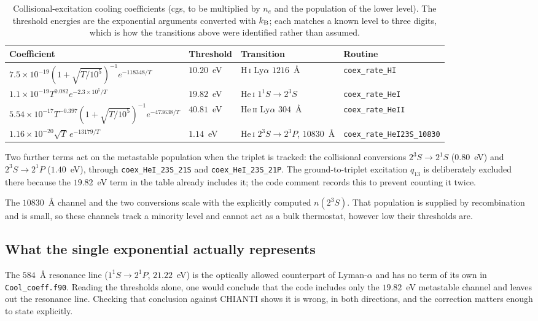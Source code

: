 \documentclass[english,a4paper]{my_memo}
\begin{document}
\begin{table}[h]
\centering
\small
\begin{tabular}{@{}llll@{}}
\toprule
Coefficient & Threshold & Transition & Routine \\
\midrule
$7.5\!\times\!10^{-19}(1+\sqrt{T/10^5})^{-1}e^{-118348/T}$
  & $10.20$~eV & H\,\textsc{i} Ly$\alpha$ $1216$~\AA{}
  & \texttt{coex\_rate\_HI} \\
$1.1\!\times\!10^{-19}T^{0.082}e^{-2.3\times10^{5}/T}$
  & $19.82$~eV & He\,\textsc{i} $1^1S \rightarrow 2^3S$
  & \texttt{coex\_rate\_HeI} \\
$5.54\!\times\!10^{-17}T^{-0.397}(1+\sqrt{T/10^5})^{-1}e^{-473638/T}$
  & $40.81$~eV & He\,\textsc{ii} Ly$\alpha$ $304$~\AA{}
  & \texttt{coex\_rate\_HeII} \\
$1.16\!\times\!10^{-20}\sqrt{T}\,e^{-13179/T}$
  & $1.14$~eV & He\,\textsc{i} $2^3S \rightarrow 2^3P$, $10830$~\AA{}
  & \texttt{coex\_rate\_HeI23S\_10830} \\
\bottomrule
\end{tabular}
\caption{Collisional-excitation cooling coefficients (cgs, to be multiplied
by $n_e$ and the population of the lower level). The threshold energies are
the exponential arguments converted with $k_{\rm B}$; each matches a known
level to three digits, which is how the transitions above were identified
rather than assumed.}
\end{table}

Two further terms act on the metastable population when the triplet is
tracked: the collisional conversions $2^3S \rightarrow 2^1S$ ($0.80$~eV) and
$2^3S \rightarrow 2^1P$ ($1.40$~eV), through
\texttt{coex\_HeI\_23S\_21S} and \texttt{coex\_HeI\_23S\_21P}. The
ground-to-triplet excitation $q_{13}$ is deliberately excluded there because
the $19.82$~eV term in the table already includes it; the code comment
records this to prevent counting it twice.

The $10830$~\AA{} channel and the two conversions scale with the explicitly
computed $n(2^3S)$. That population is supplied by recombination and is
small, so these channels track a minority level and cannot act as a bulk
thermostat, however low their thresholds are.

\subsection{What the single exponential actually represents}

The $584$~\AA{} resonance line ($1^1S \rightarrow 2^1P$, $21.22$~eV) is the
optically allowed counterpart of Lyman-$\alpha$ and has no term of its own in
\texttt{Cool\_coeff.f90}. Reading the thresholds alone, one would conclude
that the code includes only the $19.82$~eV metastable channel and leaves out
the resonance line. Checking that conclusion against CHIANTI shows it is wrong,
in both directions, and the correction matters enough to state explicitly.
\end{document}
